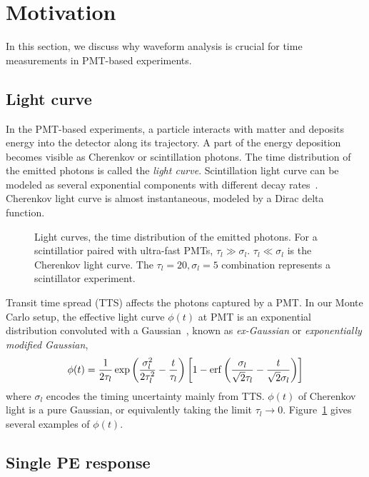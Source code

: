 \section{Motivation}
\label{sec:toyMC}

In this section, we discuss why waveform analysis is crucial for time measurements in PMT-based experiments. 

\subsection{Light curve}
In the PMT-based experiments, a particle interacts with matter and deposits energy into the detector along its trajectory. A part of the energy deposition becomes visible as Cherenkov or scintillation photons. The time distribution of the emitted photons is called the \textit{light curve}. Scintillation light curve can be modeled as several exponential components with different decay rates~\cite{rebber_particle_2021}. Cherenkov light curve is almost instantaneous, modeled by a Dirac delta function. 

\begin{figure}[!htb]
  \centering
  \resizebox{0.5\textwidth}{!}{}
  \caption{\label{fig:time-pro} Light curves, the time distribution of the emitted photons. For a scintillatior paired with ultra-fast PMTs, $\tau_l \gg \sigma_l$. $\tau_l \ll \sigma_l$ is the Cherenkov light curve. The $\tau_l=20, \sigma_l=5$ combination represents a scintillator experiment. }
\end{figure}

Transit time spread (TTS) affects the photons captured by a PMT. In our Monte Carlo setup, the effective light curve $\phi(t)$ at PMT is an exponential distribution convoluted with a Gaussian~\cite{li_separation_2016}, known as \textit{ex-Gaussian} or \textit{exponentially modified Gaussian}, 
\begin{align}
    \phi(t) = \frac{1}{2\tau_l} \exp\left(\frac{\sigma_l^2}{2\tau_l^2}-\frac{t}{\tau_l}\right) \left[1 - \operatorname{erf}\left( \frac{\sigma_l}{\sqrt{2}\tau_l} - \frac{t}{\sqrt{2}\sigma_l} \right)\right]
    \label{eq:time-pro}
\end{align}
where $\sigma_l$ encodes the timing uncertainty mainly from TTS. $\phi(t)$ of Cherenkov light is a pure Gaussian, or equivalently taking the limit $\tau_l \rightarrow 0$. Figure~\ref{fig:time-pro} gives several examples of $\phi(t)$. 

\subsection{Single PE response}
\label{subsec:spe}

